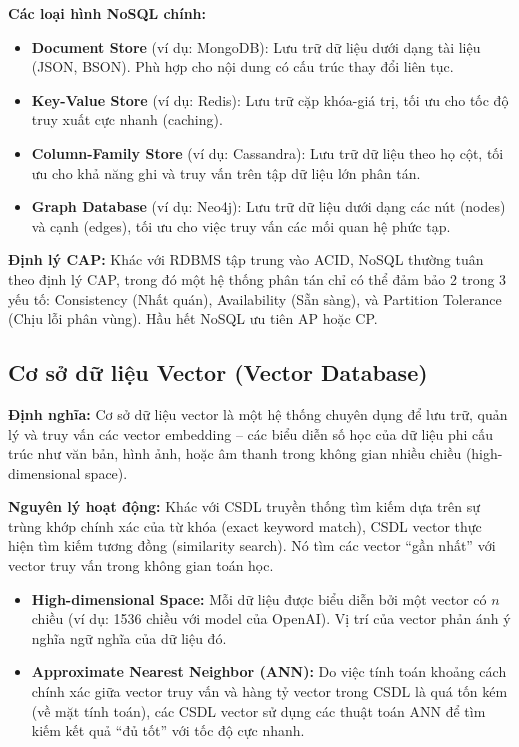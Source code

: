 \documentclass[12pt,a4paper]{report}
\begin{document}
\textbf{Các loại hình NoSQL chính:}
\begin{itemize}
    \item \textbf{Document Store} (ví dụ: MongoDB): Lưu trữ dữ liệu dưới dạng tài liệu (JSON, BSON). Phù hợp cho nội dung có cấu trúc thay đổi liên tục.
    \item \textbf{Key-Value Store} (ví dụ: Redis): Lưu trữ cặp khóa-giá trị, tối ưu cho tốc độ truy xuất cực nhanh (caching).
    \item \textbf{Column-Family Store} (ví dụ: Cassandra): Lưu trữ dữ liệu theo họ cột, tối ưu cho khả năng ghi và truy vấn trên tập dữ liệu lớn phân tán.
    \item \textbf{Graph Database} (ví dụ: Neo4j): Lưu trữ dữ liệu dưới dạng các nút (nodes) và cạnh (edges), tối ưu cho việc truy vấn các mối quan hệ phức tạp.
\end{itemize}

\textbf{Định lý CAP:} Khác với RDBMS tập trung vào ACID, NoSQL thường tuân theo định lý CAP, trong đó một hệ thống phân tán chỉ có thể đảm bảo 2 trong 3 yếu tố: Consistency (Nhất quán), Availability (Sẵn sàng), và Partition Tolerance (Chịu lỗi phân vùng). Hầu hết NoSQL ưu tiên AP hoặc CP.

\subsection{Cơ sở dữ liệu Vector (Vector Database)}
\textbf{Định nghĩa:} Cơ sở dữ liệu vector là một hệ thống chuyên dụng để lưu trữ, quản lý và truy vấn các vector embedding – các biểu diễn số học của dữ liệu phi cấu trúc như văn bản, hình ảnh, hoặc âm thanh trong không gian nhiều chiều (high-dimensional space).

\textbf{Nguyên lý hoạt động:} Khác với CSDL truyền thống tìm kiếm dựa trên sự trùng khớp chính xác của từ khóa (exact keyword match), CSDL vector thực hiện tìm kiếm tương đồng (similarity search). Nó tìm các vector ``gần nhất'' với vector truy vấn trong không gian toán học.
\begin{itemize}
    \item \textbf{High-dimensional Space:} Mỗi dữ liệu được biểu diễn bởi một vector có $n$ chiều (ví dụ: 1536 chiều với model của OpenAI). Vị trí của vector phản ánh ý nghĩa ngữ nghĩa của dữ liệu đó.
    \item \textbf{Approximate Nearest Neighbor (ANN):} Do việc tính toán khoảng cách chính xác giữa vector truy vấn và hàng tỷ vector trong CSDL là quá tốn kém (về mặt tính toán), các CSDL vector sử dụng các thuật toán ANN để tìm kiếm kết quả ``đủ tốt'' với tốc độ cực nhanh.
\end{itemize}
\end{document}
